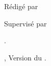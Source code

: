 \vspace*{\fill}%
\begin{center}
\vspace*{\fill}%
\makebox[\linewidth]{\HRule} %
\parbox[t]{\textwidth}{\addvspace{\parskip} %
\centering\huge\bfseries\thetitle}
 \null%
\vspace*{\parskip}
\makebox[\linewidth]{\HRule}
\vspace*{\fill}
\diagdenomb*
\vspace{\fill}
\par \Large Rédigé par \theauthor\par Supervisé par \thesupervisor \par
\vspace*{\fill}
\large{\theyearname.\par \theuniversity, Version du \thedate.}
\end{center}
